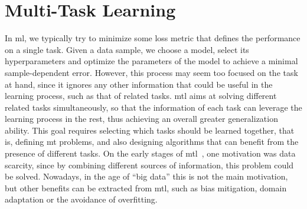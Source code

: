 
\chapter{Multi-Task Learning} %
\label{Chapter3}

\glsresetall
{} %

{\bf \small{
}}




In \acrfull{ml}, we typically try to minimize some loss metric that defines the performance on a single task. Given a data sample, we choose a model, select its hyperparameters and optimize the parameters of the model to achieve a minimal sample-dependent error. However, this process may seem too focused on the task at hand, since it ignores any other information that could be useful in the learning process, such as that of related tasks. 
\acrfull{mtl} aims at solving different related tasks simultaneously, so that the information of each task can leverage the learning process in the rest, thus achieving an overall greater generalization ability.
This goal requires selecting which tasks should be learned together, that is, defining \acrfull{mt} problems, and also designing algorithms that can benefit from the presence of different tasks.
On the early stages of \acrshort{mtl}~\citep{Caruana97,baxter2000model}, one motivation was data scarcity, since by combining different sources of information, this problem could be solved. Nowadays, in the age of ``big data'' this is not the main motivation, but other benefits can be extracted from \acrshort{mtl}, such as bias mitigation, domain adaptation or the avoidance of overfitting. 

